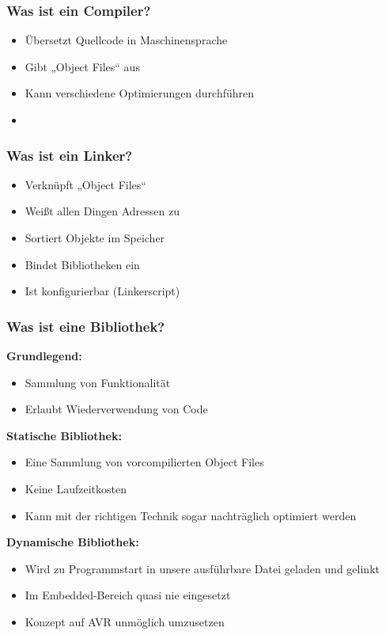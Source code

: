 \documentclass{beamer}
\begin{document}
\begin{frame}
\frametitle{Was ist ein Compiler?}
\begin{itemize}
\item Übersetzt Quellcode in Maschinensprache
\item Gibt „Object Files“ aus
\item Kann verschiedene Optimierungen durchführen
\item 
\end{itemize}

\end{frame}

\begin{frame}
\frametitle{Was ist ein Linker?}
\begin{itemize}
\item Verknüpft „Object Files“
\item Weißt allen Dingen Adressen zu
\item Sortiert Objekte im Speicher
\item Bindet Bibliotheken ein
\item Ist konfigurierbar (Linkerscript)
\end{itemize}

\end{frame}

\begin{frame}
\frametitle{Was ist eine Bibliothek?}
\textbf{Grundlegend:}
\begin{itemize}
\item Sammlung von Funktionalität
\item Erlaubt Wiederverwendung von Code
\end{itemize}

\textbf{Statische Bibliothek:}
\begin{itemize}
\item Eine Sammlung von vorcompilierten Object Files
\item Keine Laufzeitkosten
\item Kann mit der richtigen Technik sogar nachträglich optimiert werden
\end{itemize}
\textbf{Dynamische Bibliothek:}
\begin{itemize}
\item Wird zu Programmstart in unsere ausführbare Datei geladen und gelinkt
\item Im Embedded-Bereich quasi nie eingesetzt
\item Konzept auf AVR unmöglich umzusetzen
\end{itemize}
\end{frame}
\end{document}

